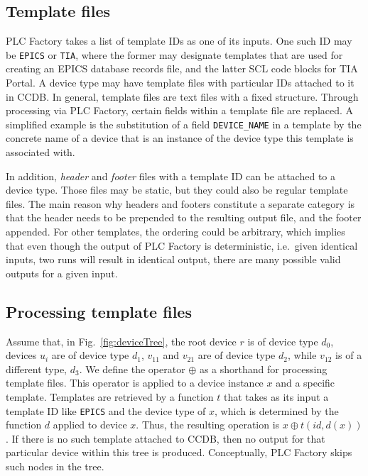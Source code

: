 \documentclass[a4paper,
              ]{jacow}
\begin{document}



\subsection{Template files}
PLC Factory takes a list of template IDs as one of its inputs. One such ID may be \texttt{EPICS} or \texttt{TIA}, where the former may designate templates that are used for creating an EPICS database records file, and the latter SCL code blocks for TIA Portal. A device type may have template files with particular IDs attached to it in CCDB. In general, template files are text files with a fixed structure. Through processing via PLC Factory, certain fields within a template file are replaced. A simplified example is the substitution of a field \texttt{DEVICE\_NAME} in a template by the concrete name of a device that is an instance of the device type this template is associated with.

In addition, \emph{header} and \emph{footer} files with a template ID can be attached to a device type. Those files may be static, but they could also be regular template files. The main reason why headers and footers constitute a separate category is that the header needs to be prepended to the resulting output file, and the footer appended. For other templates, the ordering could be arbitrary, which implies that even though the output of PLC Factory is deterministic, i.e.\ given identical inputs, two runs will result in identical output, there are many possible valid outputs for a given input.

\subsection{Processing template files}
Assume that, in Fig.\ \ref{fig:deviceTree}, the root device $r$ is of device type $d_0$, devices $u_i$ are of device type $d_1$, $v_{11}$ and $v_{21}$ are of device type $d_2$, while $v_{12}$ is of a different type, $d_3$. We define the operator $\oplus$ as a shorthand for processing template files. This operator is applied to a device instance $x$ and a specific template. Templates are retrieved by a function $t$ that takes as its input a template ID like \texttt{EPICS} and the device type of $x$, which is determined by the function $d$ applied to device $x$. Thus, the resulting operation is $x \oplus t(\mathit{id}, d(x))$. If there is no such template attached to CCDB, then no output for that particular device within this tree is produced. Conceptually, PLC Factory skips such nodes in the tree.
\end{document}
